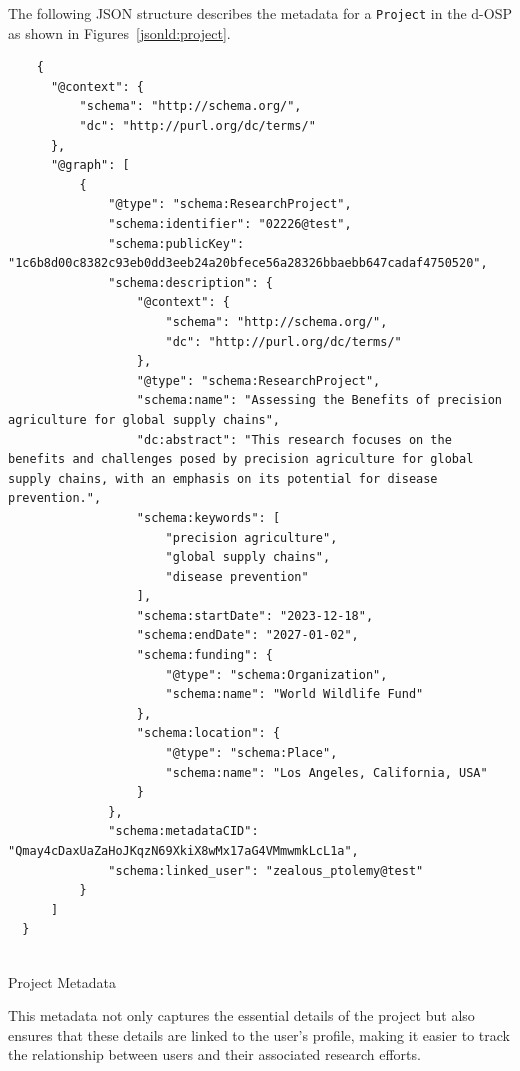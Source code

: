 \documentclass[final]{rc-book-2.14}
\begin{document}
The following JSON structure describes the metadata for a \texttt{Project} in the d-OSP as shown in Figures~\ref{jsonld:project}.


\begin{listing}
\begin{verbatim}
    {
      "@context": {
          "schema": "http://schema.org/",
          "dc": "http://purl.org/dc/terms/"
      },
      "@graph": [
          {
              "@type": "schema:ResearchProject",
              "schema:identifier": "02226@test",
              "schema:publicKey": "1c6b8d00c8382c93eb0dd3eeb24a20bfece56a28326bbaebb647cadaf4750520",
              "schema:description": {
                  "@context": {
                      "schema": "http://schema.org/",
                      "dc": "http://purl.org/dc/terms/"
                  },
                  "@type": "schema:ResearchProject",
                  "schema:name": "Assessing the Benefits of precision agriculture for global supply chains",
                  "dc:abstract": "This research focuses on the benefits and challenges posed by precision agriculture for global supply chains, with an emphasis on its potential for disease prevention.",
                  "schema:keywords": [
                      "precision agriculture",
                      "global supply chains",
                      "disease prevention"
                  ],
                  "schema:startDate": "2023-12-18",
                  "schema:endDate": "2027-01-02",
                  "schema:funding": {
                      "@type": "schema:Organization",
                      "schema:name": "World Wildlife Fund"
                  },
                  "schema:location": {
                      "@type": "schema:Place",
                      "schema:name": "Los Angeles, California, USA"
                  }
              },
              "schema:metadataCID": "Qmay4cDaxUaZaHoJKqzN69XkiX8wMx17aG4VMmwmkLcL1a",
              "schema:linked_user": "zealous_ptolemy@test"
          }
      ]
  }
  
\end{verbatim}
\caption{Project Metadata}
\label{jsonld:project}
\end{listing}



This metadata not only captures the essential details of the project but also ensures that these details are linked to the user's profile, making it easier to track the relationship between users and their associated research efforts.
\end{document}
